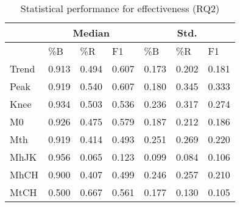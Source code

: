 \begin{table}[!tb]
\scriptsize
\caption{Statistical performance for effectiveness (RQ2)}
\label{tab:mean-effective}
\centering
\begin{tabular}{p{1.2cm}|p{0.8cm}p{0.8cm}p{0.8cm}|p{0.8cm}p{0.8cm}p{0.8cm}}
\hline
& \multicolumn{3}{c|}{Median} & \multicolumn{3}{c}{Std.} \\
\hline
 &  \%B & \%R & F1 & \%B & \%R & F1  \\
\hline
Trend & 0.913 & 0.494 & 0.607 & 0.173 & 0.202 &	0.181 \\
Peak & 0.919 & 0.540 & 0.607 & 0.180 & 0.345 & 0.333\\
Knee & 0.934 & 0.503 & 0.536 & 0.236 &	0.317 &	0.274 \\
M0 & 0.926 & 0.475 & 0.579 & 0.187 & 0.212 & 0.186\\
Mth & 0.919 & 0.414 & 0.493 & 0.251 & 0.269 & 0.220\\
MhJK & 0.956 & 0.065 & 0.123 & 0.099 &	0.084 &	0.106\\
MhCH & 0.900 & 0.407 & 0.499 & 0.246 & 0.257 &	0.210\\
MtCH & 0.500 & 0.667 & 0.561 & 0.177 & 0.130 &	0.105\\
\hline
\end{tabular}
\vspace{-0.1in}
\end{table}

